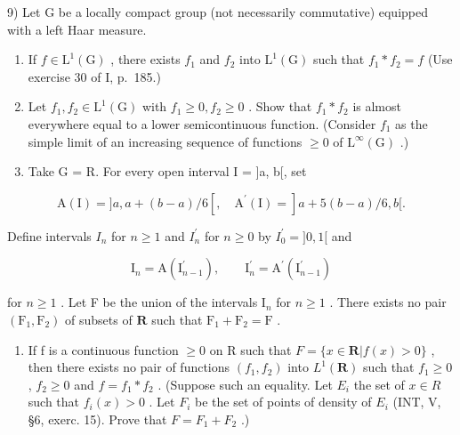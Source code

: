 9) Let G be a locally compact group (not necessarily commutative) equipped with a left Haar measure.

\begin{enumerate}
\def\labelenumi{\alph{enumi})}
\item
  If \(f \in \mathrm{L}^{1}(\mathrm{G})\) , there exists \(f_{1}\) and \(f_{2}\) into \(\mathrm{L}^{1}(\mathrm{G})\) such that \(f_{1} * f_{2} = f\) (Use exercise 30 of I, p.~185.)
\item
  Let \(f_{1}, f_{2} \in \mathrm{L}^{1}(\mathrm{G})\) with \(f_{1} \geqslant 0, f_{2} \geqslant 0\) . Show that \(f_{1} * f_{2}\) is almost everywhere equal to a lower semicontinuous function. (Consider \(f_{1}\) as the simple limit of an increasing sequence of functions \(\geqslant 0\) of \(\mathrm{L}^{\infty}(\mathrm{G})\) .)
\item
  Take G = R. For every open interval I = {]}a, b{[}, set
\end{enumerate}

\[
\mathrm{A} (\mathrm{I}) = ] a, a + (b - a) / 6 [, \quad \mathrm{A} ^ {\prime} (\mathrm{I}) = ] a + 5 (b - a) / 6, b [.
\]

Define intervals \(I_{n}\) for \(n \geqslant 1\) and \(I_{n}^{\prime}\) for \(n \geqslant 0\) by \(I_{0}^{\prime} = ]0, 1[\) and

\[
\mathrm{I} _ {n} = \mathrm{A} (\mathrm{I} _ {n - 1} ^ {\prime}), \qquad \mathrm{I} _ {n} ^ {\prime} = \mathrm{A} ^ {\prime} (\mathrm{I} _ {n - 1} ^ {\prime})
\]

for \(n \geqslant 1\) . Let F be the union of the intervals \(\mathrm{I}_n\) for \(n \geqslant 1\) . There exists no pair \((\mathrm{F}_1, \mathrm{F}_2)\) of subsets of \(\mathbf{R}\) such that \(\mathrm{F}_1 + \mathrm{F}_2 = \mathrm{F}\) .

\begin{enumerate}
\def\labelenumi{\alph{enumi})}
\setcounter{enumi}{3}
\tightlist
\item
  If f is a continuous function \(\geqslant 0\) on R such that \(F = \{x \in \mathbf{R} | f(x) > 0\}\) , then there exists no pair of functions \((f_{1}, f_{2})\) into \(L^{1}(\mathbf{R})\) such that \(f_{1} \geqslant 0\) , \(f_{2} \geqslant 0\) and \(f = f_{1} * f_{2}\) . (Suppose such an equality. Let \(E_{i}\) the set of \(x \in R\) such that \(f_{i}(x) > 0\) . Let \(F_{i}\) be the set of points of density of \(E_{i}\) (INT, V, §6, exerc. 15). Prove that \(F = F_{1} + F_{2}\) .)
\end{enumerate}

